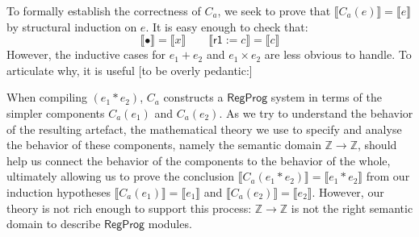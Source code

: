 \documentclass[sigplan,10pt,review,anonymous]{acmart}
\newcommand{\kw}[1]{\ensuremath{ \textsf{#1} }}
\begin{document}
{To formally establish the correctness of $C_a$,
we seek to prove that
$\llbracket C_a(e) \rrbracket = \llbracket e \rrbracket$
by structural induction on $e$.
It is easy enough to check that:
\[
  \llbracket \bullet \rrbracket = \llbracket x \rrbracket \qquad
  \llbracket \kw{r1} := c \rrbracket = \llbracket c \rrbracket
\]
However,
the inductive cases for $e_1 + e_2$ and $e_1 \times e_2$
are less obvious to handle.
To articulate why,
it is useful [to be overly pedantic:]

When compiling $(e_1 * e_2)$,
$C_a$ constructs a $\kw{RegProg}$ system
in terms of the simpler components $C_a(e_1)$ and $C_a(e_2)$.
As we try to understand the behavior of the resulting artefact,
the mathematical theory we use to specify and analyse
the behavior of these components,
namely the semantic domain $\mathbb{Z} \rightarrow \mathbb{Z}$,
should help us connect
the behavior of the components to
the behavior of the whole,
ultimately allowing us to prove
the conclusion $\llbracket C_a(e_1 * e_2) \rrbracket = \llbracket e_1 * e_2 \rrbracket$
from our induction hypotheses
$\llbracket C_a(e_1) \rrbracket = \llbracket e_1 \rrbracket$ and
$\llbracket C_a(e_2) \rrbracket = \llbracket e_2 \rrbracket$.
However,
our theory is not rich enough to support this process:
$\mathbb{Z} \rightarrow \mathbb{Z}$
is not the right semantic domain
to describe $\kw{RegProg}$ modules.


} %

\end{document}
